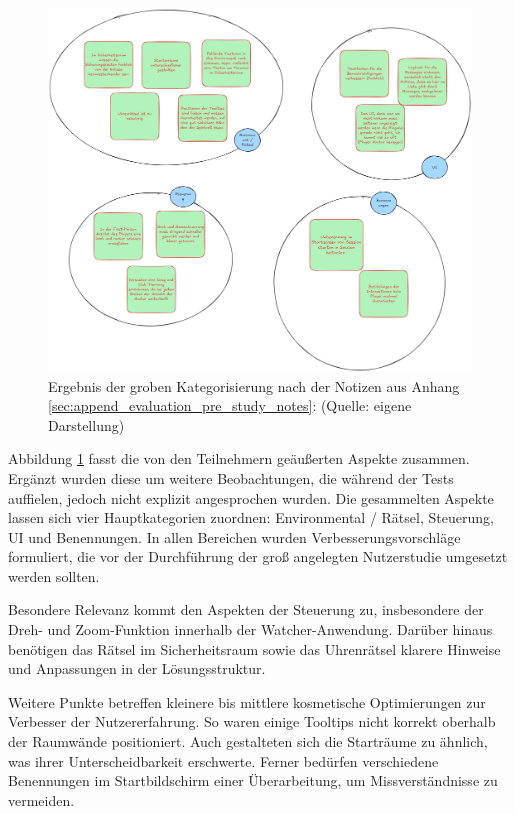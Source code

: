 \begin{figure}[ht]
\centering
\includegraphics[width=1\linewidth]{content/pictures/Prestudy-Qualitative-Auswertung-Schritt-1.png}
\caption{Ergebnis der groben Kategorisierung nach \citealp{braun_using_2006} der Notizen aus Anhang \ref{sec:append_evaluation_pre_study_notes}:  (Quelle: eigene Darstellung)}
\label{fig:pre-study-qualitative-findings}
\end{figure}

Abbildung \ref{fig:pre-study-qualitative-findings} fasst die von den Teilnehmern geäußerten Aspekte zusammen. Ergänzt wurden diese um weitere Beobachtungen, die während der Tests auffielen, jedoch nicht explizit angesprochen wurden. Die gesammelten Aspekte lassen sich vier Hauptkategorien zuordnen:  Environmental / Rätsel, Steuerung, UI und Benennungen. In allen Bereichen wurden Verbesserungsvorschläge formuliert, die vor der Durchführung der groß angelegten Nutzerstudie umgesetzt werden sollten.

Besondere Relevanz kommt den Aspekten der Steuerung zu, insbesondere der Dreh- und Zoom-Funktion innerhalb der Watcher-Anwendung. Darüber hinaus benötigen das Rätsel im Sicherheitsraum sowie das Uhrenrätsel klarere Hinweise und Anpassungen in der Lösungsstruktur.

Weitere Punkte betreffen kleinere bis mittlere kosmetische Optimierungen zur Verbesser der Nutzererfahrung. So waren einige Tooltips nicht korrekt oberhalb der Raumwände positioniert. Auch gestalteten sich die Starträume zu ähnlich, was ihrer Unterscheidbarkeit erschwerte. Ferner bedürfen verschiedene Benennungen im Startbildschirm einer Überarbeitung, um Missverständnisse zu vermeiden.

